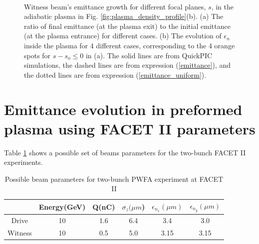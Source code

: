 \documentclass[%
reprint, superscriptaddress,
 amsmath,amssymb, aps,
prstab,
]{revtex4-2}
\begin{document}
\begin{figure} 
    \\
    \caption{Witness beam's emittance growth for
    different focal planes, $s$, in the adiabatic plasma in Fig.
\ref{fig:plasma_density_profile}(b). (a) The ratio of final emittance (at the plasma exit)
    to the initial emittance (at the plasma entrance) for different
    cases. (b) The evolution of $\epsilon_n$ inside the plasma for 4
    different cases, corresponding to the 4 orange spots for $s - s_o \leq 0$ in (a). The solid lines are from QuickPIC simulations, the dashed lines are from expression (\ref{emittance}), and the dotted lines are from expression (\ref{emittance_uniform}).}
    \label{fig:emittance_increment_adiabatic} 
\end{figure}

\section{Emittance evolution in preformed plasma using FACET II parameters}
Table \ref{table1} shows a possible set of beams parameters for the
two-bunch FACET II experiments. 
\begin{table}[htbp] \begin{center}
\begin{tabular}{|c | c c c c c|} \hline & Energy(GeV) & Q(nC) &
$\sigma_z (\mu m$) & $\epsilon_{n_x} (\mu m)$ & $\epsilon_{n_y} (\mu m)$
\\ [0.5ex] \hline Drive  & 10 & 1.6 & 6.4 & 3.4 & 3.0\\ \hline Witness 
& 10 & 0.5 & 5.0 & 3.15  & 3.15\\ \hline \end{tabular} \end{center}
\caption{Possible beam parameters for two-bunch PWFA experiment at FACET
II} \label{table1} \end{table} 
\end{document}
